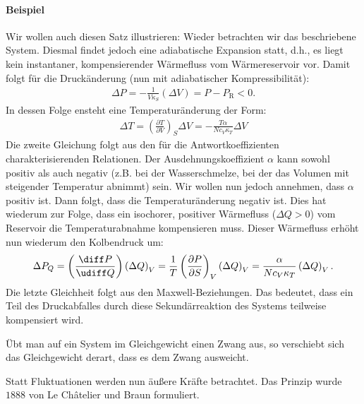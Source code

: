 \paragraph*{Beispiel} Wir wollen auch diesen Satz illustrieren: Wieder betrachten wir das beschriebene System. Diesmal findet jedoch eine adiabatische Expansion statt, d.h., es liegt kein instantaner, kompensierender Wärmefluss vom Wärmereservoir vor. Damit folgt für die Druckänderung (nun mit adiabatischer Kompressibilität):
\begin{align*}
	\Delta P= -\frac{1}{V\kappa_S}\left(\Delta V\right)=P-P_\mathrm{R}<0.
\end{align*}
In dessen Folge ensteht eine Temperaturänderung der Form:
\begin{align*}
	\Delta T=\left(\frac{\partial T}{\partial V}\right)_S\Delta V=-\frac{T\alpha}{Nc_V\kappa_T}\Delta V
\end{align*}
Die zweite Gleichung folgt aus den für die Antwortkoeffizienten charakterisierenden Relationen. Der Ausdehnungskoeffizient $\alpha$ kann sowohl positiv als auch negativ (z.B. bei der Wasserschmelze, bei der das Volumen mit steigender Temperatur abnimmt) sein. 
Wir wollen nun jedoch annehmen, dass $\alpha$ positiv ist. Dann folgt, dass die Temperaturänderung negativ ist. Dies hat wiederum zur Folge, dass ein isochorer, positiver Wärmefluss ($\Delta Q>0$) vom Reservoir die Temperaturabnahme kompensieren muss. Dieser Wärmefluss erhöht nun wiederum den Kolbendruck um:
\begin{align*}
	\Delta P_Q=\left(\frac{\diff P}{\udiff Q}\right)\left(\Delta Q\right)_V=\frac{1}{T}\left(\frac{\partial P}{\partial S}\right)_V\left(\Delta Q\right)_V=\frac{\alpha}{Nc_V\kappa_T}\left(\Delta Q\right)_V.
\end{align*}
Die letzte Gleichheit folgt aus den Maxwell-Beziehungen. Das bedeutet, dass ein Teil des Druckabfalles durch diese Sekundärreaktion des Systems teilweise kompensiert wird. 
\begin{formal}
	 Übt man auf ein System im Gleichgewicht einen Zwang aus, so verschiebt sich das Gleichgewicht derart, dass es dem Zwang ausweicht.
\end{formal} 
Statt Fluktuationen werden nun äußere Kräfte betrachtet. Das Prinzip wurde  $1888$ von Le Châtelier und Braun formuliert.
